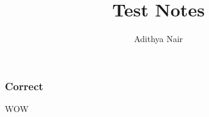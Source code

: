 \documentclass[xcolor={dvipsnames}]{beamer}
\title{Test Notes}
\author{Adithya Nair}
\begin{document}
\begin{frame}
	\titlepage	
\end{frame}
\begin{frame}
	\frametitle{Correct}
	WOW
\end{frame}
\end{document}
